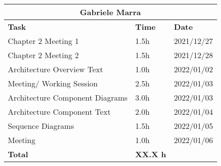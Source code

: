 \begin{table}[H]
\centering
\begin{tabular}{|p{}|p{}|p{}|}
\hline
\multicolumn{3}{|c|}{\textbf{Gabriele Marra}}            \\ \hline
\textbf{Task}                   & \textbf{Time} & \textbf{Date} \\ \hline

Chapter 2 Meeting 1				&		1.5h	   &	2021/12/27 \\ \hline
Chapter 2 Meeting 2				&		1.5h	   &	2021/12/28 \\ \hline
Architecture Overview Text		&		1.0h	   &	2022/01/02 \\ \hline
Meeting/ Working Session		&		2.5h	   &	2022/01/03 \\ \hline
Architecture Component Diagrams	&		3.0h	   &	2022/01/03 \\ \hline
Architecture Component Text		&		2.0h	   &	2022/01/04 \\ \hline
Sequence Diagrams				&		1.5h	   &	2022/01/05 \\ \hline
Meeting							&		1.0h	   &	2022/01/06 \\ \hline
\textbf{Total}                  		&  \textbf{XX.X h}   & \\ \hline
\end{tabular}
\end{table}
